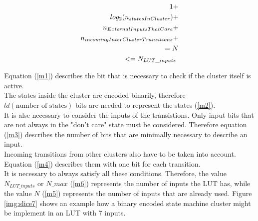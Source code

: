 \begin{center}
\begin{eqnarray}
1\vspace{1cm} \label{m1}+\\
log_2(n_{statesInCluster}) \label{m2}+ \\
n_{ExternalInputsThatCare} \label{m3}+ \\
n_{incomingInterClusterTransitions} \label{m4}+ \\
= N \label{m5}\\
<= N_{LUT\_inputs} \label{m6}\
\end{eqnarray}
\end{center}

Equation (\ref{m1}) describes the bit that is necessary to check if the cluster itself is active.\\
The states inside the cluster are encoded binarily, therefore $ld(\text{number of states})$ bits are needed to represent the states (\ref{m2}). \\
It is alse necessary to consider the inputs of the transistions. Only input bits that are not always in the "don't care" state must be considered. Therefore equation (\ref{m3}) describes the number of bits that are minimally necessary to describe an input. \\
Incoming transitions from other clusters also have to be taken into account. Equation (\ref{m4}) describes them with one bit for each transition. \\

It is necessary to always satisfy all these conditions. Therefore, the value $N_{LUT\_inputs}$ or $N\_max$ (\ref{m6}) represents the number of inputs the LUT has, while the value $N$ (\ref{m5}) represents the number of inputs that are already used.
Figure \ref{img:slice7} shows an example how a binary encoded state machine cluster might be implement in an LUT with 7 inputs.


